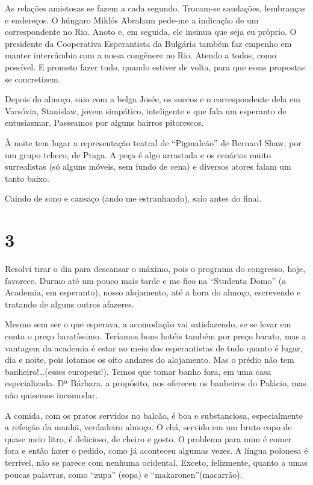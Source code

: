 As relações amistosas se fazem a cada segundo. Trocam-se saudações, lembranças e endereços. O húngaro Miklós Abraham pede-me a indicação de um correspondente no Rio. Anoto e, em seguida, ele insinua que seja eu próprio. O presidente da Cooperativa Esperantista da Bulgária também faz empenho em manter intercâmbio com a nossa congênere no Rio. Atendo a todos, como possível. E prometo fazer tudo, quando estiver de volta, para que essas propostas se concretizem.

Depois do almoço, saio com a belga Josée, os suecos e o correspondente dela em Varsóvia, Stanislaw, jovem simpático, inteligente e que fala um esperanto de entusiasmar. Passeamos por alguns bairros pitorescos.

À noite tem lugar a representação teatral de “Pigmaleão” de Bernard Shaw, por um grupo tcheco, de Praga. A peça é algo arrastada e os cenários muito surrealistas (só alguns móveis, sem fundo de cena) e diversos atores falam um tanto baixo.

Caindo de sono e cansaço (ando me estranhando), saio antes do final.

\section*{3 \adfflatleafright {}}
Resolvi tirar o dia para descansar o máximo, pois o programa do congresso, hoje, favorece. Durmo até um pouco mais tarde e me fico na “Studenta Domo” (a Academia, em esperanto), nosso alojamento, até a hora do almoço, escrevendo e tratando de alguns outros afazeres.

Mesmo sem ser o que esperava, a acomodação vai satisfazendo, se se levar em conta o preço baratíssimo. Teríamos bons hotéis também por preço barato, mas a vantagem da academia é estar no meio dos esperantistas de tudo quanto é lugar, dia e noite, pois lotamos os oito andares do alojamento. Mas o prédio não tem banheiro!\ldots (esses europeus!). Temos que tomar banho fora, em uma casa especializada. Dª Bárbara, a propósito, nos ofereceu os banheiros do Palácio, mas não quisemos incomodar.

A comida, com os pratos servidos no balcão, é boa e substanciosa, especialmente a refeição da manhã, verdadeiro almoço. O chá, servido em um bruto copo de quase meio litro, é delicioso, de cheiro e gosto. O problema para mim é comer fora e então fazer o pedido, como já aconteceu algumas vezes. A língua polonesa é terrível, não se parece com nenhuma ocidental. Exceto, felizmente, quanto a umas poucas palavras, como “zupa” (sopa) e “makaronen”(macarrão).

